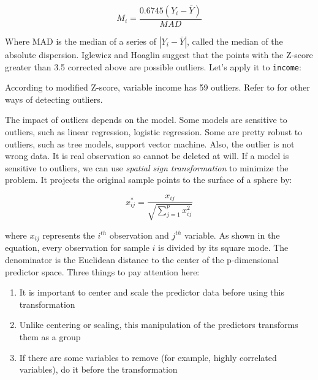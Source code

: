 \documentclass[12pt,]{krantz}
\makeatletter
\newenvironment{Shaded}{\begin{snugshade}}{\end{snugshade}}
\newcommand{\KeywordTok}[1]{\textcolor[rgb]{0.27,0.27,0.27}{\textbf{#1}}}
\newcommand{\FloatTok}[1]{\textcolor[rgb]{0.06,0.06,0.06}{#1}}
\newcommand{\CommentTok}[1]{\textcolor[rgb]{0.37,0.37,0.37}{\textit{#1}}}
\newcommand{\OperatorTok}[1]{\textcolor[rgb]{0.43,0.43,0.43}{\textbf{#1}}}
\newcommand{\NormalTok}[1]{#1}
\providecommand{\tightlist}{%
  \setlength{\itemsep}{0pt}\setlength{\parskip}{0pt}}
\newenvironment{kframe}{%
\medskip{}
\setlength{\fboxsep}{.8em}
 \def\at@end@of@kframe{}%
 \ifinner\ifhmode%
  \def\at@end@of@kframe{\end{minipage}}%
  \begin{minipage}{\columnwidth}%
 \fi\fi%
 \def\FrameCommand##1{\hskip\@totalleftmargin \hskip-\fboxsep
 \colorbox{shadecolor}{##1}\hskip-\fboxsep
     \hskip-\linewidth \hskip-\@totalleftmargin \hskip\columnwidth}%
 \MakeFramed {\advance\hsize-\width
   \@totalleftmargin\z@ \linewidth\hsize
   \@setminipage}}%
 {\par\unskip\endMakeFramed%
 \at@end@of@kframe}
\renewenvironment{Shaded}{\begin{kframe}}{\end{kframe}}
\theoremstyle{definition}
\theoremstyle{definition}
\theoremstyle{definition}
\theoremstyle{remark}
\makeatother
\begin{document}
\[M_{i}=\frac{0.6745(Y_{i}-\bar{Y})}{MAD}\]

Where MAD is the median of a series of \(|Y_ {i} - \bar{Y}|\), called
the median of the absolute dispersion. Iglewicz and Hoaglin suggest that
the points with the Z-score greater than 3.5 corrected above are
possible outliers. Let's apply it to \texttt{income}:

\begin{Shaded}
\end{Shaded}

According to modified Z-score, variable income has 59 outliers. Refer to
\citep{mad1} for other ways of detecting outliers.

The impact of outliers depends on the model. Some models are sensitive
to outliers, such as linear regression, logistic regression. Some are
pretty robust to outliers, such as tree models, support vector machine.
Also, the outlier is not wrong data. It is real observation so cannot be
deleted at will. If a model is sensitive to outliers, we can use
\emph{spatial sign transformation} \citep{ssp} to minimize the problem.
It projects the original sample points to the surface of a sphere by:

\[x_{ij}^{*}=\frac{x_{ij}}{\sqrt{\sum_{j=1}^{p}x_{ij}^{2}}}\]

where \(x_{ij}\) represents the \(i^{th}\) observation and \(j^{th}\)
variable. As shown in the equation, every observation for sample \(i\)
is divided by its square mode. The denominator is the Euclidean distance
to the center of the p-dimensional predictor space. Three things to pay
attention here:

\begin{enumerate}
\def\labelenumi{\arabic{enumi}.}
\tightlist
\item
  It is important to center and scale the predictor data before using
  this transformation
\item
  Unlike centering or scaling, this manipulation of the predictors
  transforms them as a group
\item
  If there are some variables to remove (for example, highly correlated
  variables), do it before the transformation
\end{enumerate}
\end{document}
